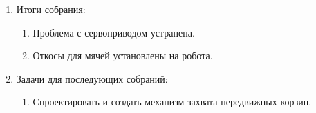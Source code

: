 \begin{enumerate}
	\item Итоги собрания: 
	\begin{enumerate}
	  \item Проблема с сервоприводом устранена.
	  
      \item Откосы для мячей установлены на робота.
      
    \end{enumerate}
    
	\item Задачи для последующих собраний:
	\begin{enumerate}
	  \item Спроектировать и создать механизм захвата передвижных корзин.
	  
    \end{enumerate}     
\end{enumerate}
\fillpage

